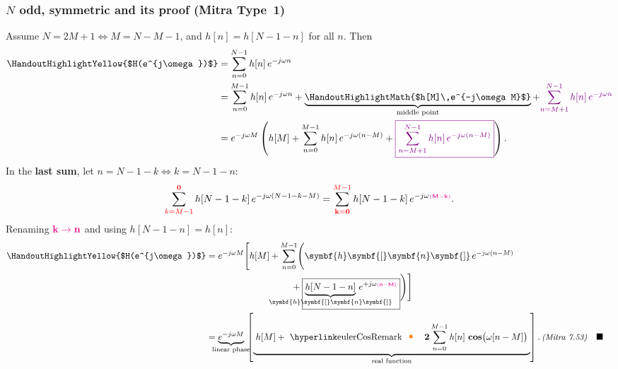 \documentclass[handout_subfiles_root.tex]{subfiles}
\begin{document}
\subsubsection{$N$ odd, symmetric and its proof (Mitra Type~1)}
\noindent Assume $N = 2M+1 \iff M = N-M-1$, and $h[n] = h[N-1-n]$ for all $n$. Then
\begin{align*}
\HandoutHighlightYellow{$H(e^{j\omega})$} &= \sum_{n=0}^{N-1} h[n]\,e^{-j\omega n} \\
&= \sum_{n=0}^{M-1} h[n]\,e^{-j\omega n}
+ \underbrace{\HandoutHighlightMath{$h[M]\,e^{-j\omega M}$}}_{\HandoutUnderbraceLabel{\text{middle point}}}
+ {\color{ee483lastsum}\sum_{n=M+1}^{N-1} h[n]\,e^{-j\omega n}} \\
&= e^{-j\omega M}\left(h[M] + \sum_{n=0}^{M-1} h[n]\,e^{-j\omega(n-M)} + \fcolorbox{ee483lastsum}{white}{\color{ee483lastsum}$\displaystyle\sum_{n=M+1}^{N-1} h[n]\,e^{-j\omega(n-M)}$}\right).
\end{align*}
In the \textcolor{ee483lastsum}{\textbf{last sum}}, let $n = N-1-k \iff k = N-1-n$:
\begin{equation*}
\sum_{\textcolor{red}{k=M-1}}^{\textcolor{red}{\mathbf{0}}} h[N-1-k]\,e^{-j\omega(N-1-k-M)} = \sum_{\textcolor{red}{\mathbf{k=0}}}^{\textcolor{red}{M-1}} h[N-1-k]\,e^{-j\omega\HandoutPinkSup{(M-k)}}.
\end{equation*}
%
Renaming $\HandoutPinkEmph{k\to n}$ and using $h[N-1-n]=h[n]$:
\begin{align*}
\HandoutHighlightYellow{$H(e^{j\omega})$} &= e^{-j\omega M}\Bigg[h[M] + \sum_{n=0}^{M-1}\Biggl( \symbf{h}\symbf{[}\symbf{n}\symbf{]}\,e^{-j\omega(n-M)} \notag\\
&\hspace{9.4em} + \boxed{\underbrace{h[N-1-n]}_{\HandoutUnderbraceLabel{\symbf{h}\symbf{[}\symbf{n}\symbf{]}}}\,e^{+j\omega\HandoutPinkSup{(n-M)}}}\Biggr)\Bigg] \\
&= \underbrace{e^{-j\omega M}}_{\HandoutUnderbraceLabel{\text{linear phase}}}\,
\left[\underbrace{\mkern5mu h[M] + \HandoutEulerMarkLinkMath\,\mathbf{2}\sum_{n=0}^{M-1} h[n]\,\mathop{\mathbf{cos}\!}\big(\omega[n-M]\big)\mkern5mu}_{\HandoutUnderbraceLabel{\text{real function}}}\right].\MitraEq{7.53} && \HandoutQEDalign
\end{align*}
\end{document}
